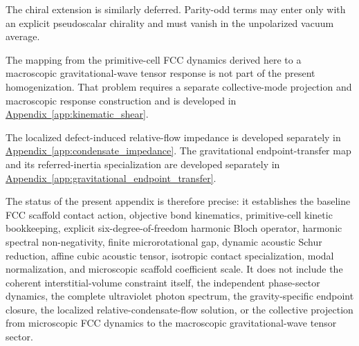 The chiral extension is similarly deferred. Parity-odd terms may enter only with an explicit pseudoscalar chirality and must vanish in the unpolarized vacuum average.

The mapping from the primitive-cell FCC dynamics derived here to a macroscopic gravitational-wave tensor response is not part of the present homogenization. That problem requires a separate collective-mode projection and macroscopic response construction and is developed in \hyperref[app:kinematic_shear]{Appendix~\ref*{app:kinematic_shear}}.

The localized defect-induced relative-flow impedance is developed separately in \hyperref[app:condensate_impedance]{Appendix~\ref*{app:condensate_impedance}}. The gravitational endpoint-transfer map and its referred-inertia specialization are developed separately in \hyperref[app:gravitational_endpoint_transfer]{Appendix~\ref*{app:gravitational_endpoint_transfer}}.

The status of the present appendix is therefore precise: it establishes the baseline FCC scaffold contact action, objective bond kinematics, primitive-cell kinetic bookkeeping, explicit six-degree-of-freedom harmonic Bloch operator, harmonic spectral non-negativity, finite microrotational gap, dynamic acoustic Schur reduction, affine cubic acoustic tensor, isotropic contact specialization, modal normalization, and microscopic scaffold coefficient scale. It does not include the coherent interstitial-volume constraint itself, the independent phase-sector dynamics, the complete ultraviolet photon spectrum, the gravity-specific endpoint closure, the localized relative-condensate-flow solution, or the collective projection from microscopic FCC dynamics to the macroscopic gravitational-wave tensor sector.
